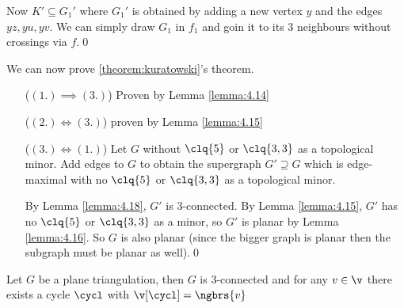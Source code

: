 \begin{prf}
\begin{enumerate}
        Now $K' \subseteq G_1'$ where $G_1'$ is obtained by adding a new vertex $y$ and the edges $yz, yu, yv$. We can simply draw $G_1$ in $f_1$ and goin it to its $3$ neighbours without crossings via $f$.\qed
    \end{enumerate}
\end{prf}
\begin{prf}
    We can now prove \ref{theorem:kuratowski}'s theorem.
    \begin{itemize}
        \item[($(1.) \implies (3.)$)] Proven by Lemma \ref{lemma:4.14}
        \item[($(2.) \iff (3.)$)] proven by Lemma \ref{lemma:4.15}
        \item[($(3.) \iff (1.)$)] Let $G$ without $\clq{5}$ or $\clq{3, 3}$ as a topological minor. Add edges to $G$ to obtain the supergraph $G' \supseteq G$ which is edge-maximal with no $\clq{5}$ or $\clq{3, 3}$ as a topological minor.
        
        By Lemma \ref{lemma:4.18}, $G'$ is $3$-connected. By Lemma \ref{lemma:4.15}, $G'$ has no $\clq{5}$ or $\clq{3, 3}$ as a minor, so $G'$ is planar by Lemma \ref{lemma:4.16}. So $G$ is also planar (since the bigger graph is planar then the subgraph must be planar as well).\qed
    \end{itemize}
\end{prf}
\begin{customcorollary}{4.19}
\label{corollary:4.19}
    Let $G$ be a plane triangulation, then $G$ is $3$-connected and for any $v \in \v$ there exists a cycle $\cycl$ with $\v[\cycl] = \ngbrs{v}$
\end{customcorollary}